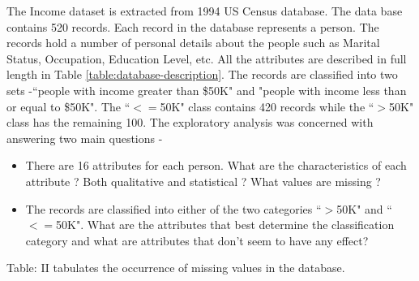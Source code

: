 The Income dataset is extracted from 1994 US Census database. The data base contains 520 records. Each record in the database represents a person. The records hold a number of personal details about the people such as Marital Status, Occupation, Education Level, etc. All the attributes are described in full length in Table \ref{table:database-description}. The records are classified into two sets -``people with income greater than \$50K" and "people with income less than or equal to \$50K". The ``$<=$50K" class contains 420 records while the ``$>$50K" class has the remaining 100. The exploratory analysis was concerned with answering two main questions - 
\begin{itemize}
\item There are 16 attributes for each person. What are the characteristics of each attribute ? Both qualitative and statistical ? What values are missing ? 
\item The records are classified into either of the two categories ``$>$50K" and ``$<=$50K". What are the attributes that best determine the classification category and what are attributes that don't seem to have any effect?
\end{itemize}

Table: II tabulates the occurrence of missing values in the database.

